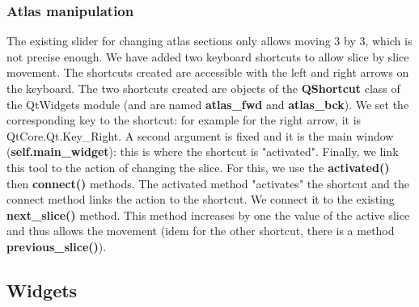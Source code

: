 \documentclass[a4paper,12pt]{report}
\begin{document}
\subsubsection{Atlas manipulation}
The existing slider for changing atlas sections only allows moving 3 by 3, which is not precise enough. We have added two keyboard shortcuts to allow slice by slice movement. The shortcuts created are accessible with the left and right arrows on the keyboard. The two shortcuts created are objects of the \textbf{QShortcut} class of the QtWidgets module (and are named \textbf{atlas\_fwd} and \textbf{atlas\_bck}). We set the corresponding key to the shortcut: for example for the right arrow, it is QtCore.Qt.Key\_Right. A second argument is fixed and it is the main window (\textbf{self.main\_widget}): this is where the shortcut is "activated". Finally, we link this tool to the action of changing the slice. For this, we use the \textbf{activated()} then \textbf{connect()} methods. The activated method "activates" the shortcut and the connect method links the action to the shortcut. We connect it to the existing \textbf{next\_slice()} method. This method increases by one the value of the active slice and thus allows the movement (idem for the other shortcut, there is a method \textbf{previous\_slice()}).\\


\subsection{Widgets}
\end{document}
